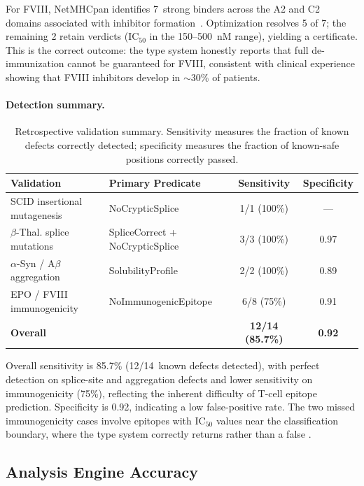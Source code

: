 For FVIII, NetMHCpan identifies 7~strong binders across the A2 and C2
domains associated with inhibitor
formation~\cite{geigert2014immunogenicity}.  Optimization resolves 5 of
7; the remaining 2 retain \UNCERTAIN{} verdicts (IC$_{50}$ in the
150--500~nM range), yielding a \BRONZE{} certificate.  This is the
correct outcome: the type system honestly reports that full de-immunization
cannot be guaranteed for FVIII, consistent with clinical experience
showing that FVIII inhibitors develop in $\sim$30\% of patients.

\paragraph{Detection summary.}

\begin{table}[t]
\centering
\caption{Retrospective validation summary.  Sensitivity measures the
         fraction of known defects correctly detected; specificity
         measures the fraction of known-safe positions correctly passed.}
\label{tab:retrosummary}
\begin{tabular}{llcc}
\toprule
\textbf{Validation} & \textbf{Primary Predicate} &
  \textbf{Sensitivity} & \textbf{Specificity} \\
\midrule
SCID insertional mutagenesis & NoCrypticSplice & 1/1 (100\%) & --- \\
$\beta$-Thal. splice mutations & SpliceCorrect + NoCrypticSplice &
  3/3 (100\%) & 0.97 \\
$\alpha$-Syn / A$\beta$ aggregation & SolubilityProfile &
  2/2 (100\%) & 0.89 \\
EPO / FVIII immunogenicity & NoImmunogenicEpitope &
  6/8 (75\%) & 0.91 \\
\midrule
\textbf{Overall} & & \textbf{12/14 (85.7\%)} & \textbf{0.92} \\
\bottomrule
\end{tabular}
\end{table}

Overall sensitivity is 85.7\% (12/14~known defects detected), with
perfect detection on splice-site and aggregation defects and lower
sensitivity on immunogenicity (75\%), reflecting the inherent difficulty
of T-cell epitope prediction.  Specificity is 0.92, indicating a low
false-positive rate.  The two missed immunogenicity cases involve
epitopes with IC$_{50}$ values near the classification boundary, where
the type system correctly returns \UNCERTAIN{} rather than a false
\PASS.

\subsection{Analysis Engine Accuracy}\label{sec:engineaccuracy}

